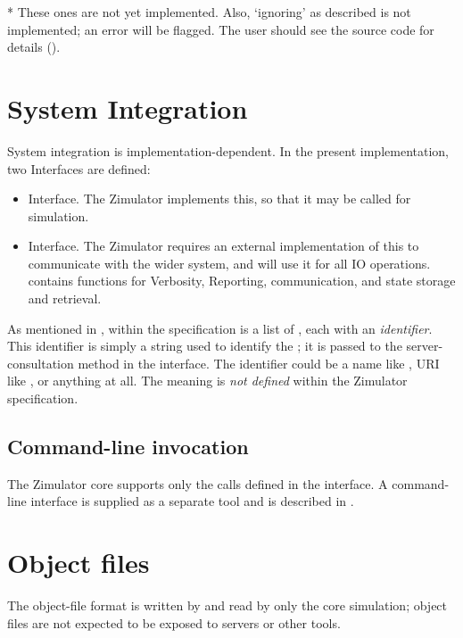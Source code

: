 * These ones are not yet implemented. Also, `ignoring'
as described is not implemented; an error will be flagged.
The user should see the source code for details ().

\section{System Integration}
\label{sysinteg}

System integration is implementation-dependent.
In the present implementation, two Interfaces are defined:
\begin{itemize}
\item {} Interface. The Zimulator implements this, so that it
  may be called for simulation.
\item {} Interface. The Zimulator requires an external
  implementation of this to communicate with the wider system, and
  will use it for all IO operations.  contains functions for
  Verbosity, Reporting,  communication, and state
  storage and retrieval.
\end{itemize}

As mentioned in , within the 
specification is a list of , each with an
\emph{identifier}.  This identifier is simply a string used to
identify the ; it is passed to the server-consultation
method in the  interface. The identifier could be a name like
, URI like , or
anything at all. The meaning is \emph{not defined} within the Zimulator
specification.

\subsection{Command-line invocation}

The Zimulator core supports only the calls defined in the  interface.
A command-line interface is supplied as a separate tool and is described in .

\section{Object files}
\label{ObjFileFormat}

The object-file format is written by and read by only the core
simulation; object files are not expected to be exposed to servers or
other tools.

